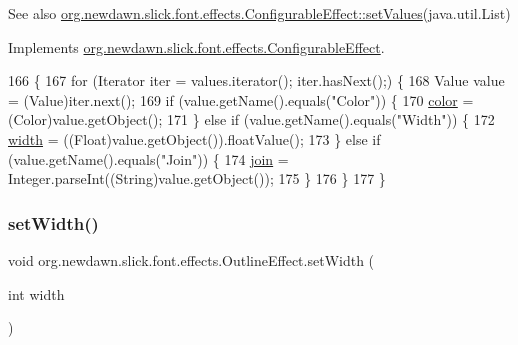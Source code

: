 \begin{DoxySeeAlso}{See also}
\mbox{\hyperlink{interfaceorg_1_1newdawn_1_1slick_1_1font_1_1effects_1_1_configurable_effect_ac5e1cb43cb0c6b61753616dc746903a2}{org.\+newdawn.\+slick.\+font.\+effects.\+Configurable\+Effect\+::set\+Values}}(java.\+util.\+List) 
\end{DoxySeeAlso}


Implements \mbox{\hyperlink{interfaceorg_1_1newdawn_1_1slick_1_1font_1_1effects_1_1_configurable_effect_ac5e1cb43cb0c6b61753616dc746903a2}{org.\+newdawn.\+slick.\+font.\+effects.\+Configurable\+Effect}}.


\begin{DoxyCode}
166                                         \{
167         \textcolor{keywordflow}{for} (Iterator iter = values.iterator(); iter.hasNext();) \{
168             Value value = (Value)iter.next();
169             \textcolor{keywordflow}{if} (value.getName().equals(\textcolor{stringliteral}{"Color"})) \{
170                 \mbox{\hyperlink{classorg_1_1newdawn_1_1slick_1_1font_1_1effects_1_1_outline_effect_a00160c4c005cb659d45c135a2798005f}{color}} = (Color)value.getObject();
171             \} \textcolor{keywordflow}{else} \textcolor{keywordflow}{if} (value.getName().equals(\textcolor{stringliteral}{"Width"})) \{
172                 \mbox{\hyperlink{classorg_1_1newdawn_1_1slick_1_1font_1_1effects_1_1_outline_effect_aad96e33c4fb5804e7423df04e1cc1936}{width}} = ((Float)value.getObject()).floatValue();
173             \} \textcolor{keywordflow}{else} \textcolor{keywordflow}{if} (value.getName().equals(\textcolor{stringliteral}{"Join"})) \{
174                 \mbox{\hyperlink{classorg_1_1newdawn_1_1slick_1_1font_1_1effects_1_1_outline_effect_a913a20571098d37c45f5aff95ff844f9}{join}} = Integer.parseInt((String)value.getObject());
175             \}
176         \}
177     \}
\end{DoxyCode}
\mbox{\label{classorg_1_1newdawn_1_1slick_1_1font_1_1effects_1_1_outline_effect_a1168574f5e6988eab798b7955756a923}} 
\subsubsection{\texorpdfstring{set\+Width()}{setWidth()}}
{\footnotesize\ttfamily void org.\+newdawn.\+slick.\+font.\+effects.\+Outline\+Effect.\+set\+Width (\begin{DoxyParamCaption}\item[{int}]{width }\end{DoxyParamCaption})\hspace{0.3cm}{\ttfamily [inline]}}

